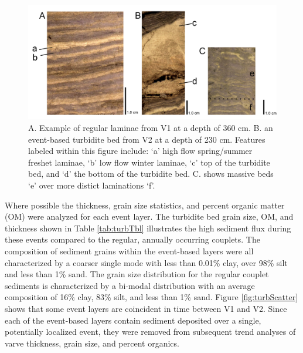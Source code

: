 \documentclass[Royal,times,doublespace,sageh]{sagej}
\begin{document}
\begin{figure}

{\centering \includegraphics[width=1\linewidth]{../figs/long_core/good_vs_flood_vs_disturbed_varves_} 

}

\caption{A. Example of regular laminae from V1 at a depth of 360 cm. B. an event-based turbidite bed from V2 at a depth of 230 cm. Features labeled within this figure include: ‘a’ high flow spring/summer freshet laminae, ‘b’ low flow winter laminae, ‘c’  top of the turbidite bed, and ‘d’ the bottom of the turbidite bed. C. shows massive beds ‘e’ over more distict laminations ‘f’.\label{tab:varve-turb}}\label{fig:varve-turb}
\end{figure}

Where possible the thickness, grain size statistics, and percent organic
matter (OM) were analyzed for each event layer. The turbidite bed grain
size, OM, and thickness shown in Table \ref{tab:turbTbl} illustrates the
high sediment flux during these events compared to the regular, annually
occurring couplets. The composition of sediment grains within the
event-based layers were all characterized by a coarser single mode with
less than 0.01\% clay, over 98\% silt and less than 1\% sand. The grain
size distribution for the regular couplet sediments is characterized by
a bi-modal distribution with an average composition of 16\% clay, 83\%
silt, and less than 1\% sand. Figure \ref{fig:turbScatter} shows that
some event layers are coincident in time between V1 and V2. Since each
of the event-based layers contain sediment deposited over a single,
potentially localized event, they were removed from subsequent trend
analyses of varve thickness, grain size, and percent organics.
\end{document}
